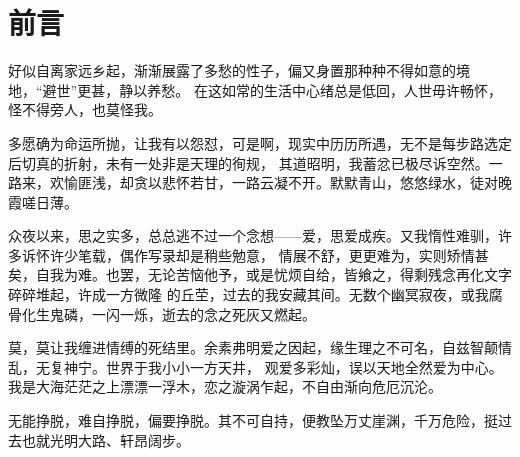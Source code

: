 \part{前言}

\vspace*{2\ccwd}

\hspace*{2em} 好似自离家远乡起，渐渐展露了多愁的性子，偏又身置那种种不得如意的境地，“避世”更甚，静以养愁。
在这如常的生活中心绪总是低回，人世毋许畅怀，怪不得旁人，也莫怪我。

\vspace*{\ccwd}

\hspace*{2em} 多愿确为命运所抛，让我有以怨怼，可是啊，现实中历历所遇，无不是每步路选定后切真的折射，未有一处非是天理的徇规，
其道昭明，我蓄忿已极尽诉空然。一路来，欢愉匪浅，却贪以悲怀若甘，一路云凝不开。默默青山，悠悠绿水，徒对晚霞嗟日薄。

\vspace*{\ccwd}

\hspace*{2em} 众夜以来，思之实多，总总逃不过一个念想——爱，思爱成疾。又我惰性难驯，许多诉怀许少笔载，偶作写录却是稍些勉意，
情展不舒，更更难为，实则矫情甚矣，自我为难。也罢，无论苦恼他予，或是忧烦自给，皆飨之，得剩残念再化文字碎碎堆起，许成一方微隆
的丘茔，过去的我安藏其间。无数个幽冥寂夜，或我腐骨化生鬼磷，一闪一烁，逝去的念之死灰又燃起。

\vspace*{\ccwd}

\hspace*{2em} 莫，莫让我缠进情缚的死结里。余素弗明爱之因起，缘生理之不可名，自兹智颠情乱，无复神宁。世界于我小小一方天井，
观爱多彩灿，误以天地全然爱为中心。我是大海茫茫之上漂漂一浮木，恋之漩涡乍起，不自由渐向危厄沉沦。

\vspace*{\ccwd}

\hspace*{2em} 无能挣脱，难自挣脱，偏要挣脱。其不可自持，便教坠万丈崖渊，千万危险，挺过去也就光明大路、轩昂阔步。

\newpage